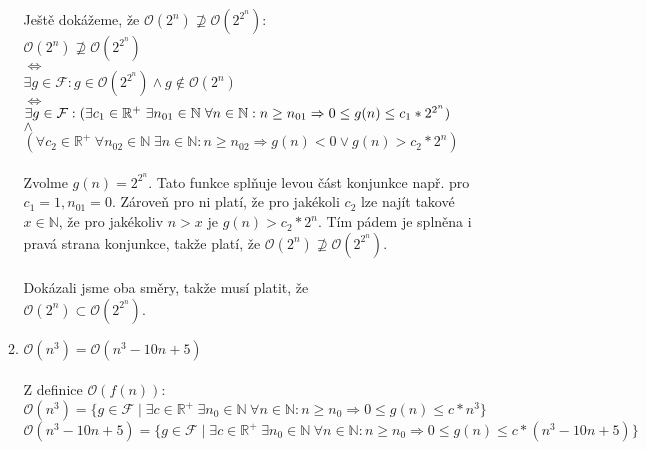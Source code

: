 \documentclass[a4paper,11pt]{article}[24.3.2010]
\begin{document}
\begin{enumerate}
\begin{enumerate}
      Ještě dokážeme, že $\mathcal{O}(2^n) \not\supseteq \mathcal{O}(2^{2^n})$: \\
      $\mathcal{O}(2^n) \not\supseteq \mathcal{O}(2^{2^n})$\\
      $\Leftrightarrow$\\
      $\exists g \in \mathcal{F} : g \in \mathcal{O}(2^{2^n}) \wedge g \notin \mathcal{O}(2^n)$\\
      $\Leftrightarrow$\\
      $\exists g \in \mathcal{F} : \\(\exists c_{1} \in \mathbb{R}^+ \hspace{3pt} \exists n_{01} \in \mathbb{N} \hspace{3pt} \forall n \in \mathbb{N} : n \geq n_{01} \Rightarrow 0 \leq g(n) \leq c_{1}*2^{2^n})$\\
      $\wedge$\\
      $(\forall c_{2} \in \mathbb{R}^+ \hspace{3pt} \forall n_{02} \in \mathbb{N} \hspace{3pt} \exists n \in \mathbb{N} : n \geq n_{02} \Rightarrow g(n) < 0 \vee g(n) > c_{2}*2^n)$\\\\
      Zvolme $g(n)=2^{2^n}$. Tato funkce splňuje levou část konjunkce např. pro $c_{1}=1, n_{01}=0$. Zároveň pro ni platí, že pro jakékoli  $c_{2}$ lze najít takové $x \in \mathbb{N}$, že pro jakékoliv $n>x$  je $g(n)>c_{2}*2^n$. Tím pádem je splněna i pravá strana konjunkce, takže platí, že $\mathcal{O}(2^n) \not\supseteq \mathcal{O}(2^{2^n})$.\\\\
Dokázali jsme oba směry, takže musí platit, že \\$\mathcal{O}(2^n) \subset \mathcal{O}(2^{2^n})$.\\
\item $\mathcal{O}(n^3) = \mathcal{O}(n^3 - 10n + 5)$\\\\
Z definice $\mathcal{O}(f(n))$:\\
      $\mathcal{O}(n^3) = \{g \in \mathcal{F} \mid \exists c \in \mathbb{R}^+ \hspace{3pt} \exists n_{0} \in \mathbb{N} \hspace{3pt} \forall n \in \mathbb{N} : n \geq n_{0} \Rightarrow 0 \leq g(n) \leq c*n^3\}$\\
      $\mathcal{O}(n^3 - 10n + 5) = \{g \in \mathcal{F} \mid \exists c \in \mathbb{R}^+ \hspace{3pt} \exists n_{0} \in \mathbb{N} \hspace{3pt} \forall n \in \mathbb{N} : n \geq n_{0} \Rightarrow 0 \leq g(n) \leq c*(n^3 - 10n + 5)\}$\\\\

\end{enumerate}
\end{enumerate}
\end{document}
